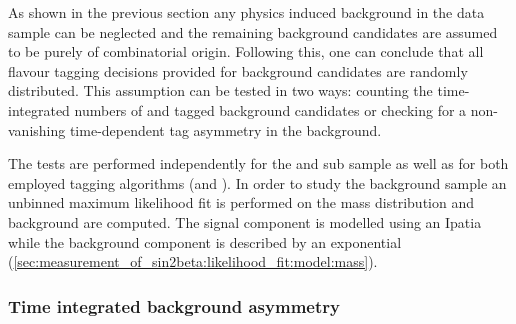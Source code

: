 As shown in the previous section any physics induced background in the data
sample can be neglected and the remaining background candidates are assumed to
be purely of combinatorial origin. Following this, one can conclude that all
flavour tagging decisions provided for background candidates are randomly
distributed. This assumption can be tested in two ways: counting the
time-integrated numbers of \Bd and \Bdbar tagged background candidates or
checking for a non-vanishing time-dependent tag asymmetry in the background. 

The tests are performed independently for the \catDD and \catLL sub sample as
well as for both employed tagging algorithms (\OS and \SSpi). In order to study
the background sample an unbinned maximum likelihood fit is performed on the \Bd
mass distribution and background \sWeights are computed. The signal component is
modelled using an Ipatia \PDF while the background component is described by an
exponential \PDF (\cf \cref{sec:measurement_of_sin2beta:likelihood_fit:model:mass}).

\subsubsection{Time integrated background asymmetry}
\label{sec:measurement_of_sin2beta:physic_backgrounds:tagging_asymmetries:time_integrated}

